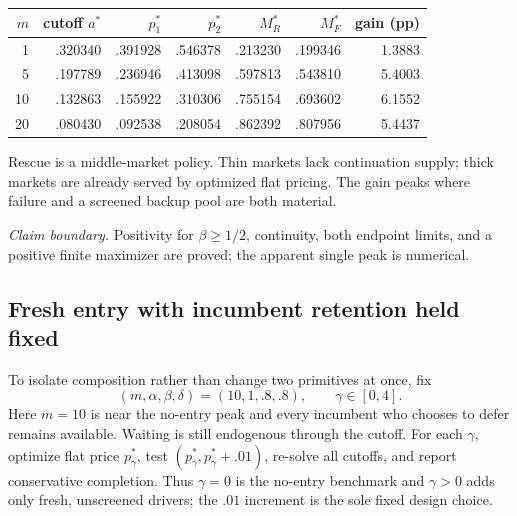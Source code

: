 \documentclass[11pt]{article}
\newcommand{\takeaway}[1]{\par\smallskip\noindent #1\par\smallskip}
\begin{document}
\begin{center}
\small
\begin{tabular}{@{}rrrrrrr@{}}
\toprule
$m$ & cutoff $a^*$ & $p_1^*$ & $p_2^*$ &
$M_R^*$ & $M_F^*$ & gain (pp)\\
\midrule
1  & .320340 & .391928 & .546378 & .213230 & .199346 & 1.3883\\
5  & .197789 & .236946 & .413098 & .597813 & .543810 & 5.4003\\
10 & .132863 & .155922 & .310306 & .755154 & .693602 & 6.1552\\
20 & .080430 & .092538 & .208054 & .862392 & .807956 & 5.4437\\
\bottomrule
\end{tabular}
\end{center}

\takeaway{Rescue is a middle-market policy.  Thin markets lack continuation
supply; thick markets are already served by optimized flat pricing.  The gain
peaks where failure and a screened backup pool are both material.}

\noindent\textit{Claim boundary.} Positivity for $\beta\ge1/2$, continuity,
both endpoint limits, and a positive finite maximizer are proved; the apparent
single peak is numerical.

\clearpage
\subsection{Fresh entry with incumbent retention held fixed}

To isolate composition rather than change two primitives at once, fix
\[
(m,\alpha,\beta,\delta)=(10,1,.8,.8),\qquad
\gamma\in[0,4].
\]
Here $m=10$ is near the no-entry peak and every incumbent who chooses to defer
remains available.  Waiting is still endogenous through the cutoff.  For each
$\gamma$, optimize flat price $p_\gamma^*$, test
$(p_\gamma^*,p_\gamma^*+.01)$, re-solve all cutoffs, and report conservative
completion.  Thus $\gamma=0$ is the no-entry benchmark and $\gamma>0$ adds only
fresh, unscreened drivers; the $.01$ increment is the sole fixed design choice.
\end{document}
